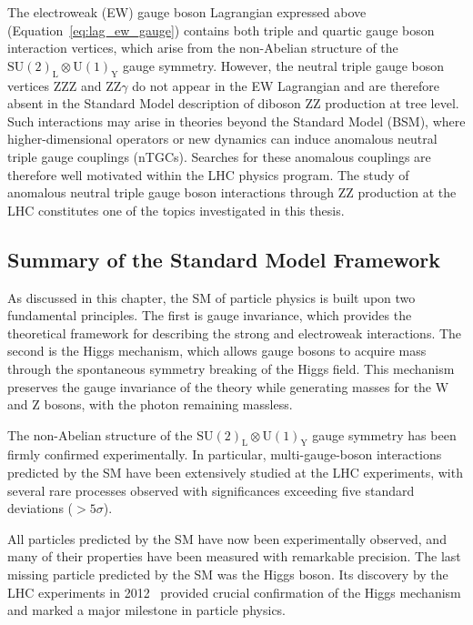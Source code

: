 The electroweak (EW) gauge boson Lagrangian expressed above (Equation~\eqref{eq:lag_ew_gauge}) contains both triple and quartic gauge boson interaction vertices, which arise from the non-Abelian structure of the $\mathrm{SU}(2)_{\text{L}} \otimes \mathrm{U}(1)_{\text{Y}}$ gauge symmetry. 
However, the neutral triple gauge boson vertices $\text{ZZZ}$ and $\text{ZZ}\gamma$ do not appear in the EW Lagrangian and are therefore absent in the Standard Model description of diboson $\text{ZZ}$ production at tree level. Such interactions may arise in theories beyond the Standard Model (BSM), where higher-dimensional operators or new dynamics can induce anomalous neutral triple gauge couplings (nTGCs). Searches for these anomalous couplings are therefore well motivated within the LHC physics program. The study of anomalous neutral triple gauge boson interactions through $\text{ZZ}$ production at the LHC constitutes one of the topics investigated in this thesis.

\subsection{Summary of the Standard Model Framework}

As discussed in this chapter, the SM of particle physics is built upon two fundamental principles. The first is gauge invariance, which provides the theoretical framework for describing the strong and electroweak interactions. The second is the Higgs mechanism, which allows gauge bosons to acquire mass through the spontaneous symmetry breaking of the Higgs field. This mechanism preserves the gauge invariance of the theory while generating masses for the $\text{W}$ and $\text{Z}$ bosons, with the photon remaining massless.

The non-Abelian structure of the $\mathrm{SU}(2)_{\text{L}} \otimes \mathrm{U}(1)_{\text{Y}}$ gauge symmetry has been firmly confirmed experimentally. In particular, multi-gauge-boson interactions predicted by the SM have been extensively studied at the LHC experiments, with several rare processes observed with significances exceeding five standard deviations ($>5\sigma$).

All particles predicted by the SM have now been experimentally observed, and many of their properties have been measured with remarkable precision. The last missing particle predicted by the SM was the Higgs boson. Its discovery by the LHC experiments in 2012~\cite{ATLAS2012Higgs,CMS2012Higgs} provided crucial confirmation of the Higgs mechanism and marked a major milestone in particle physics.

